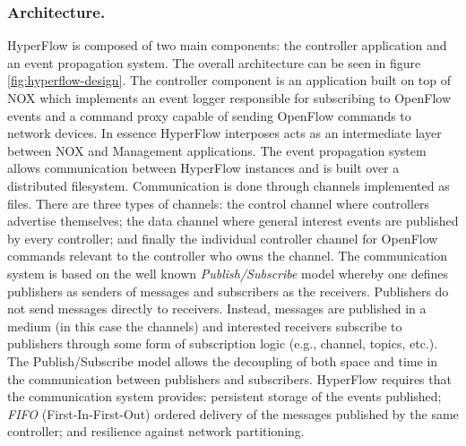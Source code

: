 \documentclass[12pt,openright,twoside]{report}
\begin{document}
\begin{itemize}
\subsubsection{Architecture.} HyperFlow is composed of two main components: the controller application
and an event propagation system. The overall architecture can be seen
in figure \ref{fig:hyperflow-design}. The controller component is
an application built on top of NOX \cite{Gude:2008jd} which implements an event logger
responsible for subscribing to OpenFlow events and a command proxy
capable of sending OpenFlow commands to  network devices. In essence
HyperFlow interposes acts as an intermediate layer between NOX and
Management applications. The event
propagation system allows  communication between HyperFlow
instances and  is built over a distributed filesystem. Communication
is done through channels implemented as files. There are three types of channels: the
control channel where controllers advertise themselves; the data
channel where general interest events are published by every
controller;  and finally the individual controller channel for OpenFlow
commands relevant to the controller who owns the channel. The
communication system is based on the well known \emph{Publish/Subscribe}
model  whereby one defines publishers as senders of
messages and subscribers as the receivers. Publishers do not send
messages directly  to receivers.  Instead,
messages are published in a medium (in this case the channels) and
interested receivers subscribe to publishers through some form of
subscription logic (e.g., channel, topics, etc.). The Publish/Subscribe
model allows the decoupling of both space and time in the
communication between publishers and subscribers. 
HyperFlow requires that the communication system  provides:
persistent storage of the events published; \emph{FIFO}
(First-In-First-Out)  ordered delivery of
the messages published by the same controller; and resilience against
network partitioning.


\end{itemize}
\end{document}
